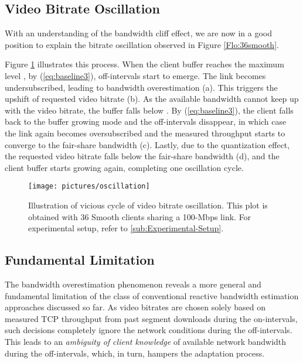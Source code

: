 \documentclass[conference]{IEEEtran}
\theoremstyle{plain}
\theoremstyle{definition}
\theoremstyle{plain}
\theoremstyle{plain}
\begin{document}
\subsection{Video Bitrate Oscillation}

With an understanding of the bandwidth cliff effect, we are now in
a good position to explain the bitrate oscillation observed in Figure
\ref{Flo:36smooth}. 

Figure \ref{Flo:oscillation} illustrates this process. When the client
buffer reaches the maximum level \textbf{}, by (\ref{eq:baseline3}),
off-intervals start to emerge. The link becomes undersubscribed, leading
to bandwidth overestimation (a). This triggers the upshift of requested
video bitrate (b). As the available bandwidth cannot keep up with
the video bitrate, the buffer falls below \textbf{}. By
(\ref{eq:baseline3}), the client falls back to the buffer growing
mode and the off-intervals disappear, in which case the link again
becomes oversubscribed and the measured throughput starts to converge
to the fair-share bandwidth (c). Lastly, due to the quantization effect,
the requested video bitrate falls below the fair-share bandwidth (d),
and the client buffer starts growing again, completing one oscillation
cycle.

\begin{figure}
\begin{centering}
\vspace{0.1in}
\texttt{[image: pictures/oscillation]}\vspace{-0.1in}

\par\end{centering}

\caption{Illustration of vicious cycle of video bitrate oscillation. This plot
is obtained with 36 Smooth clients sharing a 100-Mbps link. For experimental
setup, refer to \ref{sub:Experimental-Setup}. }


\label{Flo:oscillation} \vspace{-0.05in}
\end{figure}



\subsection{Fundamental Limitation}



The bandwidth overestimation phenomenon reveals a more general and
fundamental limitation of the class of conventional reactive bandwidth
estimation approaches discussed so far. As video bitrates are chosen
solely based on measured TCP throughput from past segment downloads
during the on-intervals, such decisions completely ignore the network
conditions during the off-intervals. This leads to an \emph{ambiguity
of client knowledge} of available network bandwidth during the off-intervals,
which, in turn, hampers the adaptation process. 
\end{document}
